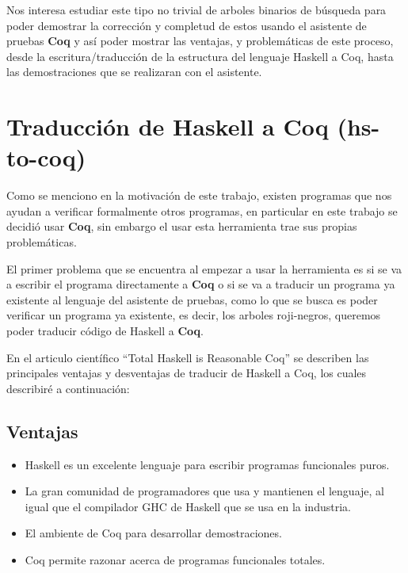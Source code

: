 \documentclass[8pt,leqno,pdflatex,spanish]{book}
\newcommand{\coq}{\textbf{Coq}}
\newcommand{\arns}{arboles roji-negros}
\theoremstyle{plain}
\theoremstyle{definition}
\theoremstyle{remark}
\begin{document}
Nos interesa estudiar este tipo no trivial de arboles binarios de búsqueda para poder demostrar la 
correcci\'on y completud de estos usando el asistente de pruebas {\coq} y así poder mostrar las
ventajas, y problemáticas de este proceso, desde la escritura/traducción de la estructura del 
lenguaje Haskell a Coq, hasta las demostraciones que se realizaran con el asistente.

\section{Traducción de Haskell a {\coq} (hs-to-coq)}
Como se menciono en la motivación de este trabajo, existen programas que nos ayudan a verificar 
formalmente otros programas, en particular en este trabajo se decidió usar {\coq}, sin embargo el 
usar esta herramienta trae sus propias problemáticas.

El primer problema que se encuentra al empezar a usar la herramienta es si se va a escribir el 
programa directamente a {\coq} o si se va a traducir un programa ya existente al lenguaje del 
asistente de pruebas, como lo que se busca es poder verificar un programa ya existente, es decir, 
los {\arns}, queremos poder traducir código de Haskell a {\coq}. 

En el articulo científico ``Total Haskell is Reasonable Coq''\cite{thrc} se describen las 
principales ventajas y desventajas de traducir de Haskell a Coq, los cuales describiré a 
continuaci\'on:

\subsection{Ventajas}
\begin{itemize}
    \item Haskell es un excelente lenguaje para escribir programas funcionales puros.
    \item La gran comunidad de programadores que usa y mantienen el lenguaje, al igual que el 
    compilador GHC de Haskell que se usa en la industria.
    \item El ambiente de Coq para desarrollar demostraciones.
    \item Coq permite razonar acerca de programas funcionales totales.
\end{itemize}
\end{document}
